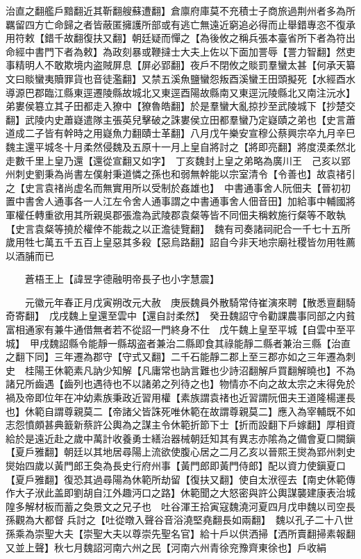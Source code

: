 治直之翻艦戶黯翻近其靳翻艘蘇遭翻】倉廪府庫莫不充積士子商旅過荆州者多為所羈留四方亡命歸之者皆蔽匿擁護所部或有逃亡無遠近窮追必得而止舉錯專恣不復承用符敕【錯千故翻復扶又翻】朝廷疑而憚之【為後攸之稱兵張本臺省所下者為符出命經中書門下者為敕】為政刻暴或鞭撻士大夫上佐以下面加詈辱【詈力智翻】然吏事精明人不敢欺境内盗賊屏息【屏必郢翻】夜戶不閉攸之賧罰羣蠻太甚【何承天纂文曰賧蠻夷贖罪貨也音徒濫翻】又禁五溪魚鹽蠻怨叛酉溪蠻王田頭擬死【水經酉水導源巴郡臨江縣東逕遷陵縣故城北又東逕酉陽故縣南又東逕沅陵縣北又南注沅水】弟婁侯簒立其子田都走入獠中【獠魯皓翻】於是羣蠻大亂掠抄至武陵城下【抄楚交翻】武陵内史蕭嶷遣隊主張英兒擊破之誅婁侯立田都羣蠻乃定嶷賾之弟也【史言蕭道成二子皆有幹時之用嶷魚力翻賾士革翻】八月戊午樂安宣穆公蔡興宗卒九月辛巳魏主還平城冬十月柔然侵魏及五原十一月上皇自將討之【將即亮翻】將度漠柔然北走數千里上皇乃還【還從宣翻又如字】　丁亥魏封上皇之弟略為廣川王　己亥以郢州刺史劉秉為尚書左僕射秉道憐之孫也和弱無幹能以宗室清令【令善也】故袁禇引之【史言袁禇尚虚名而無實用所以受制於姦雄也】　中書通事舍人阮佃夫【晉初初置中書舍人通事各一人江左令舍人通事謂之中書通事舍人佃音田】加給事中輔國將軍權任轉重欲用其所親吳郡張澹為武陵郡袁粲等皆不同佃夫稱敕施行粲等不敢執【史言袁粲等撓於權倖不能裁之以正澹徒覽翻】　魏有司奏諸祠祀合一千七十五所歲用牲七萬五千五百上皇惡其多殺【惡烏路翻】詔自今非天地宗廟社稷皆勿用牲薦以酒脯而已

　　蒼梧王上【諱昱字德融明帝長子也小字慧震】

　　元徽元年春正月戊寅朔改元大赦　庚辰魏員外散騎常侍崔演來聘【散悉亶翻騎奇寄翻】　戊戌魏上皇還至雲中【還自討柔然】　癸丑魏詔守令勸課農事同部之内貧富相通家有兼牛通借無者若不從詔一門終身不仕　戊午魏上皇至平城【自雲中至平城】　甲戌魏詔縣令能靜一縣刼盗者兼治二縣即食其祿能靜二縣者兼治三縣【治直之翻下同】三年遷為郡守【守式又翻】二千石能靜二郡上至三郡亦如之三年遷為刺史　桂陽王休範素凡訥少知解【凡庸常也訥言難也少詩沼翻解戶買翻解曉也】不為諸兄所齒遇【齒列也遇待也不以諸弟之列待之也】物情亦不向之故太宗之末得免於禍及帝即位年在冲幼素族秉政近習用權【素族謂袁禇也近習謂阮佃夫王道隆楊運長也】休範自謂尊親莫二【帝諸父皆誅死唯休範在故謂尊親莫二】應入為宰輔既不如志怨憤頗甚典籖新蔡許公輿為之謀主令休範折節下士【折而設翻下戶嫁翻】厚相資給於是遠近赴之歲中萬計收養勇士繕治器械朝廷知其有異志亦隂為之備會夏口闕鎭【夏戶雅翻】朝廷以其地居尋陽上流欲使腹心居之二月乙亥以晉熙王爕為郢州刺史爕始四歲以黃門郎王奐為長史行府州事【黃門郎即黃門侍郎】配以資力使鎭夏口【夏戶雅翻】復恐其過尋陽為休範所劫留【復扶又翻】使自太洑徑去【南史休範傳作大子洑此盖即劉胡自江外趣沔口之路】休範聞之大怒密與許公輿謀襲建康表治城隍多解材板而蓄之奐景文之兄子也　吐谷渾王拾寅寇魏澆河夏四月戊申魏以司空長孫觀為大都督兵討之【吐從暾入聲谷音浴澆堅堯翻長如兩翻】　魏以孔子二十八世孫乘為崇聖大夫【崇聖大夫以尊崇先聖名官】給十戶以供洒掃【洒所賣翻掃素報翻又並上聲】秋七月魏詔河南六州之民【河南六州青徐兖豫齊東徐也】戶收絹

